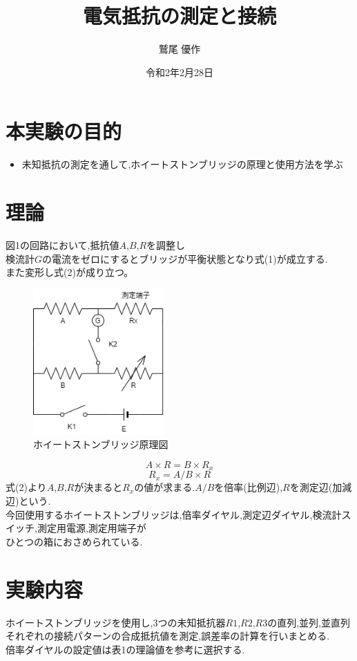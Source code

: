 \documentclass[titlepage]{jarticle}
\title{電気抵抗の測定と接続}
\author{鷲尾 優作}
\date{令和2年2月28日}
\begin{document}
\maketitle

\section{本実験の目的}
\begin{itemize}
    \item 未知抵抗の測定を通して,ホイートストンブリッジの原理と使用方法を学ぶ
\end{itemize}

\section{理論}
図1の回路において,抵抗値$A$,$B$,$R$を調整し\\
検流計$G$の電流をゼロにするとブリッジが平衡状態となり式(1)が成立する.\\
また変形し式(2)が成り立つ。\\
\begin{figure}[H]
    \begin{center}
        \includegraphics[width=5cm]{image/image01.png}
        \caption{ホイートストンブリッジ原理図}
    \end{center}
\end{figure}
\begin{equation}
    A×R = B×R_x
\end{equation}
\begin{equation}
    R_x = A/B×R
\end{equation}
式(2)より$A$,$B$,$R$が決まると$R_x$の値が求まる.$A/B$を倍率(比例辺),$R$を測定辺(加減辺)という.\\
今回使用するホイートストンブリッジは,倍率ダイヤル,測定辺ダイヤル,検流計スイッチ,測定用電源,測定用端子が\\
ひとつの箱におさめられている.
\section{実験内容}
ホイートストンブリッジを使用し,3つの未知抵抗器$R1$,$R2$,$R3$の直列,並列,並直列\\
それぞれの接続パターンの合成抵抗値を測定,誤差率の計算を行いまとめる.\\
倍率ダイヤルの設定値は表1の理論値を参考に選択する.
\end{document}
